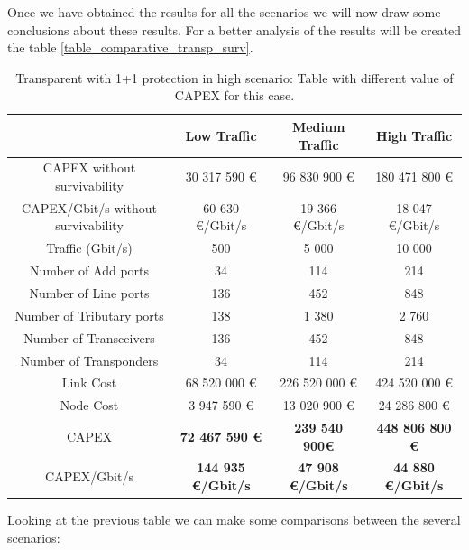 Once we have obtained the results for all the scenarios we will now draw some conclusions about these results. For a better analysis of the results will be created the table \ref{table_comparative_transp_surv}.\\

\begin{table}[h!]
\centering
\begin{tabular}{| c | c | c | c |}
 \hline
  & Low Traffic & Medium Traffic  & High Traffic \\
 \hline\hline
 CAPEX without survivability&30 317 590 \euro&96 830 900 \euro&180 471 800 \euro\\ \hline
 CAPEX/Gbit/s without survivability&60 630 \euro/Gbit/s& 19 366 \euro/Gbit/s&18 047 \euro/Gbit/s\\ \hline
 Traffic (Gbit/s) & 500 & 5 000 & 10 000 \\ \hline
 Number of Add ports & 34 & 114 & 214 \\ \hline
 Number of Line ports & 136 & 452 & 848 \\ \hline
 Number of Tributary ports & 138 & 1 380 & 2 760 \\ \hline
 Number of Transceivers & 136 & 452 & 848 \\ \hline
 Number of Transponders & 34 & 114 & 214 \\ \hline
 Link Cost & 68 520 000 \euro & 226 520 000 \euro & 424 520 000 \euro \\ \hline
 Node Cost & 3 947 590 \euro & 13 020 900 \euro & 24 286 800 \euro \\ \hline
 CAPEX & \textbf{72 467 590 \euro} & \textbf{239 540 900\euro} & \textbf{448 806 800 \euro} \\ \hline
 CAPEX/Gbit/s & \textbf{144 935 \euro/Gbit/s} & \textbf{47 908 \euro/Gbit/s} & \textbf{44 880 \euro/Gbit/s}\\
 \hline
\end{tabular}
\caption{Transparent with 1+1 protection in high scenario: Table with different value of CAPEX for this case.}
\label{table_comparative_transp_protec}
\end{table}

\newpage
Looking at the previous table we can make some comparisons between the several scenarios:

